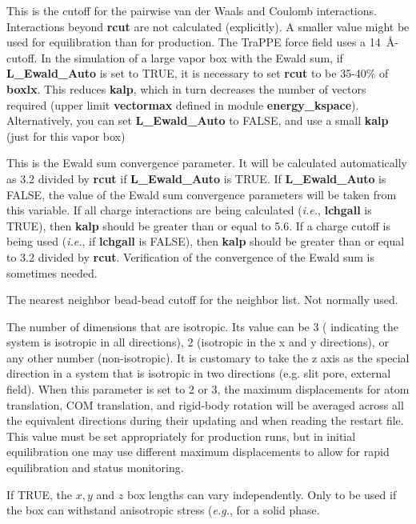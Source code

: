 \documentclass[12pt,letterpaper]{article}
\begin{document}
 This is the cutoff for the pairwise van
der Waals and Coulomb interactions. Interactions beyond {\bf
  rcut} are not calculated (explicitly). A smaller value
might be used for equilibration than for production. The
TraPPE force field uses a 14~\AA-cutoff. In the simulation
of a large vapor box with the Ewald sum, if {\bf
  L\_Ewald\_Auto} is set to TRUE, it is necessary to set
{\bf rcut} to be 35-40\% of {\bf boxlx}. This reduces {\bf
  kalp}, which in turn decreases the number of vectors
required (upper limit {\bf vectormax} defined in module {\bf
  energy\_kspace}). Alternatively, you can set {\bf
  L\_Ewald\_Auto} to FALSE, and use a small {\bf kalp} (just
for this vapor box)

 This is the Ewald sum convergence
parameter. It will be calculated automatically as 3.2
divided by {\bf rcut} if {\bf L\_Ewald\_Auto} is TRUE. If
{\bf L\_Ewald\_Auto} is FALSE, the value of the Ewald sum
convergence parameters will be taken from this variable. If
all charge interactions are being calculated (\textit{i.e.},
{\bf lchgall} is TRUE), then {\bf kalp} should be greater
than or equal to 5.6. If a charge cutoff is being used
(\textit{i.e.}, if {\bf lchgall} is FALSE), then {\bf kalp}
should be greater than or equal to 3.2 divided by {\bf
  rcut}. Verification of the convergence of the Ewald sum is
sometimes needed.

 The nearest neighbor bead-bead cutoff
for the neighbor list. Not normally used.

 The number of
dimensions that are isotropic. Its value can be 3 (
indicating the system is isotropic in all directions), 2
(isotropic in the x and y directions), or any other number
(non-isotropic). It is customary to take the z axis as the
special direction in a system that is isotropic in two
directions (e.g. slit pore, external field). When this
parameter is set to 2 or 3, the maximum displacements for
atom translation, COM translation, and rigid-body rotation
will be averaged across all the equivalent directions during
their updating and when reading the restart file. This value
must be set appropriately for production runs, but in
initial equilibration one may use different maximum
displacements to allow for rapid equilibration and status
monitoring.

 If TRUE, the $x, y$ and $z$ box
lengths can vary independently. Only to be used if the box
can withstand anisotropic stress (\textit{e.g.}, for a solid
phase.
\end{document}
